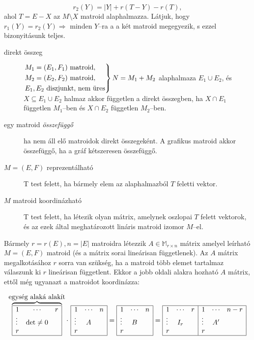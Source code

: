 \[ r_2(Y) = |Y| + r(T-Y) - r(T),\] ahol $T = E-X$ az $M\setminus X$ matroid
alaphalmazza. Látjuk, hogy $r_1(Y)=r_2(Y)\Rightarrow$ minden $Y$--ra a a két
matroid megegyezik, s ezzel bizonyitásunk teljes.

\begin{description}
  \item[direkt összeg] $\begin{rcases}
  M_1=(E_1,F_1) \mbox{ matroid}, \\
  M_2=(E_2,F_2) \mbox{ matroid}, \\
  E_1, E_2 \mbox{ diszjunkt, nem üres} \end{rcases} N = M_1+ M_2$ alaphalmaza
  $E_1 \cup E_2$, és $X \subseteq E_1 \cup E_2$ halmaz akkor független a direkt
  összegben, ha $X \cap E_1$ független $M_1$--ben és $X \cap E_2$ független
  $M_2$--ben. 
  \item[egy matroid \emph{összefüggő}] ha nem áll elő matroidok direkt
  összegeként. A grafikus matroid akkor összefüggő, ha a gráf kétszeresen
  összefüggő.
  \item[$M=(E,F)$ reprezentálható] T test felett, ha bármely elem az alaphalmazból
  $T$ feletti vektor. 
  \item[$M$ matroid koordinázható]T test felett, ha létezik olyan mátrix, amelynek oszlopai
  $T$ felett vektorok, és az ezek által meghatározott lináris matroid izomor $M$--el. 
\end{description}

Bármely $r=r(E), n=|E|$ matroidra létezzik $A \in \mathbb{M}_{r\times n}$ mátrix
amelyel leírható $M=(E,F)$ matroid (és a mátrix sorai lineárisan függetlenek).
Az $A$ mátrix megalkotásához $r$ sorra van szükség, ha a matroid több elemet
tartalmaz válaszunk ki $r$ lineárisan függetlent. Ekkor a jobb oldali alakra
hozható $A$ mátrix, ettől még ugyanazt a matroidot koordinázza:

\[
\overbrace{
\begin{array}{|lcr|}
\hline
1 & \cdots & r\\
\vdots  & \mbox{det} \neq 0 &\\
r &  & \\
\hline
\end{array}}^{\mbox{egység alaká alakít}}
\cdot~
\begin{array}{|lcr|}
\hline
1 & \cdots & n\\
\vdots  & A &\\
r &  & \\
\hline
\end{array}
=
\begin{array}{|lcr|}
\hline
1 & \cdots & n\\
\vdots  & B &\\
r &  & \\
\hline
\end{array}
=
\begin{array}{|lcr|lcr|}
\hline
1 & \cdots & r &1&\cdots&n-r\\
\vdots  & I_r &&\vdots&A'&\\
r &  & & r&&\\
\hline
\end{array}
\]

